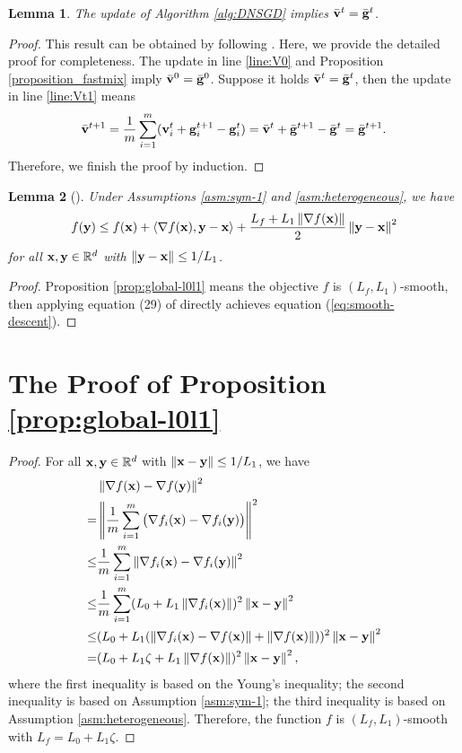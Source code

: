 \documentclass[sigconf]{acmart}
\newcommand{\Norm}[1]{\left\| #1 \right\|}
\def\inner#1#2{\left\langle #1, #2 \right\rangle}
\def\vg{{\bf{g}}}
\def\vv{{\bf{v}}}
\def\vx{{\bf{x}}}
\def\vy{{\bf{y}}}
\def\BR{{\mathbb{R}}}
\theoremstyle{plain}
\newtheorem{lem}{Lemma}
\def\bg{{\bar\vg}}
\def\bv{{\bar\vv}}
\begin{document}
\begin{lem}
The update of Algorithm \ref{alg:DNSGD}  implies $\bv^t = \bg^t$.   
\end{lem}
\begin{proof}
This result can be obtained by following \citet[Lemma 2]{luo2022complexity}. Here, we provide the detailed proof for completeness.
The update in line \ref{line:V0} and Proposition \ref{proposition_fastmix} imply $\bv^0=\bg^0$. Suppose it holds $\bv^t=\bg^t$, then the update in line \ref{line:Vt1} means
\begin{align*}
    \bv^{t+1} = \frac{1}{m}\sum_{i=1}^m (\vv_i^t + \vg_i^{t+1} - \vg_i^t) = \bv^t + \bg^{t+1} - \bg^t = \bg^{t+1}.
\end{align*}
Therefore, we finish the proof by induction.
\end{proof}

\begin{lem}[{\citet[Appendix A.1]{zhang2020improved}}]\label{lem:sym-smooth}
Under Assumptions \ref{asm:sym-1} and \ref{asm:heterogeneous}, we have
\begin{align}\label{eq:smooth-descent}
    f(\vy) \leq f(\vx) + \inner{\nabla f(\vx)}{\vy-\vx} + \frac{L_f+L_1\Norm{\nabla f(\vx)}}{2}\Norm{\vy-\vx}^2
\end{align}
for all $\vx,\vy\in\BR^d$ with $\Norm{\vy-\vx}\leq 1/L_1$.
\end{lem}
\begin{proof}
Proposition \ref{prop:global-l0l1} means the objective $f$ is $(L_f, L_1)$-smooth, 
then applying equation (29) of \citet[Appendix A.1]{zhang2020improved} directly achieves equation (\ref{eq:smooth-descent}).
\end{proof}

\section{The Proof of Proposition \ref{prop:global-l0l1}}\label{sec:proof-global-l0l1}
\begin{proof}    
For all $\vx,\vy\in\BR^d$ with $\Norm{\vx-\vy}\leq 1/L_1$, we have
\begin{align*}
   & \Norm{\nabla f(\vx) - \nabla f(\vy)}^2 \\
=  & \Norm{\frac{1}{m}\sum_{i=1}^m\big(\nabla f_i(\vx) - \nabla f_i(\vy)\big)}^2 \\
\leq & \frac{1}{m}\sum_{i=1}^m\Norm{\nabla f_i(\vx) - \nabla f_i(\vy)}^2 \\
\leq & \frac{1}{m}\sum_{i=1}^m (L_0 + L_1\Norm{\nabla f_i(\vx)})^2\Norm{\vx-\vy}^2 \\
\leq & (L_0 + L_1(\Norm{\nabla f_i(\vx)-\nabla f(\vx)} + \Norm{\nabla f(\vx)}))^2\Norm{\vx-\vy}^2 \\
= &  (L_0 +L_1\zeta + L_1\Norm{\nabla f(\vx)})^2\Norm{\vx-\vy}^2,
\end{align*}
where the first inequality is based on the Young's inequality; the second inequality is based on Assumption \ref{asm:sym-1}; the third inequality is based on Assumption \ref{asm:heterogeneous}.
Therefore, the function $f$ is $(L_f,L_1)$-smooth with $L_f=L_0+L_1\zeta$.
\end{proof}
\end{document}
